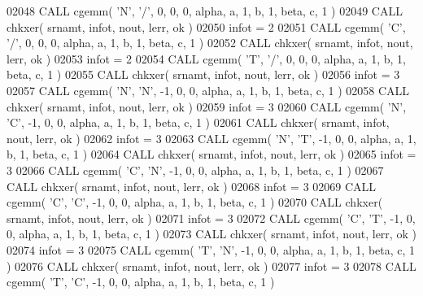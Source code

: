 \begin{DoxyCode}
02048       \textcolor{keyword}{CALL }cgemm( \textcolor{stringliteral}{'N'}, \textcolor{stringliteral}{'/'}, 0, 0, 0, alpha, a, 1, b, 1, beta, c, 1 )
02049       \textcolor{keyword}{CALL }chkxer( srnamt, infot, nout, lerr, ok )
02050       infot = 2
02051       \textcolor{keyword}{CALL }cgemm( \textcolor{stringliteral}{'C'}, \textcolor{stringliteral}{'/'}, 0, 0, 0, alpha, a, 1, b, 1, beta, c, 1 )
02052       \textcolor{keyword}{CALL }chkxer( srnamt, infot, nout, lerr, ok )
02053       infot = 2
02054       \textcolor{keyword}{CALL }cgemm( \textcolor{stringliteral}{'T'}, \textcolor{stringliteral}{'/'}, 0, 0, 0, alpha, a, 1, b, 1, beta, c, 1 )
02055       \textcolor{keyword}{CALL }chkxer( srnamt, infot, nout, lerr, ok )
02056       infot = 3
02057       \textcolor{keyword}{CALL }cgemm( \textcolor{stringliteral}{'N'}, \textcolor{stringliteral}{'N'}, -1, 0, 0, alpha, a, 1, b, 1, beta, c, 1 )
02058       \textcolor{keyword}{CALL }chkxer( srnamt, infot, nout, lerr, ok )
02059       infot = 3
02060       \textcolor{keyword}{CALL }cgemm( \textcolor{stringliteral}{'N'}, \textcolor{stringliteral}{'C'}, -1, 0, 0, alpha, a, 1, b, 1, beta, c, 1 )
02061       \textcolor{keyword}{CALL }chkxer( srnamt, infot, nout, lerr, ok )
02062       infot = 3
02063       \textcolor{keyword}{CALL }cgemm( \textcolor{stringliteral}{'N'}, \textcolor{stringliteral}{'T'}, -1, 0, 0, alpha, a, 1, b, 1, beta, c, 1 )
02064       \textcolor{keyword}{CALL }chkxer( srnamt, infot, nout, lerr, ok )
02065       infot = 3
02066       \textcolor{keyword}{CALL }cgemm( \textcolor{stringliteral}{'C'}, \textcolor{stringliteral}{'N'}, -1, 0, 0, alpha, a, 1, b, 1, beta, c, 1 )
02067       \textcolor{keyword}{CALL }chkxer( srnamt, infot, nout, lerr, ok )
02068       infot = 3
02069       \textcolor{keyword}{CALL }cgemm( \textcolor{stringliteral}{'C'}, \textcolor{stringliteral}{'C'}, -1, 0, 0, alpha, a, 1, b, 1, beta, c, 1 )
02070       \textcolor{keyword}{CALL }chkxer( srnamt, infot, nout, lerr, ok )
02071       infot = 3
02072       \textcolor{keyword}{CALL }cgemm( \textcolor{stringliteral}{'C'}, \textcolor{stringliteral}{'T'}, -1, 0, 0, alpha, a, 1, b, 1, beta, c, 1 )
02073       \textcolor{keyword}{CALL }chkxer( srnamt, infot, nout, lerr, ok )
02074       infot = 3
02075       \textcolor{keyword}{CALL }cgemm( \textcolor{stringliteral}{'T'}, \textcolor{stringliteral}{'N'}, -1, 0, 0, alpha, a, 1, b, 1, beta, c, 1 )
02076       \textcolor{keyword}{CALL }chkxer( srnamt, infot, nout, lerr, ok )
02077       infot = 3
02078       \textcolor{keyword}{CALL }cgemm( \textcolor{stringliteral}{'T'}, \textcolor{stringliteral}{'C'}, -1, 0, 0, alpha, a, 1, b, 1, beta, c, 1 )

\end{DoxyCode}
